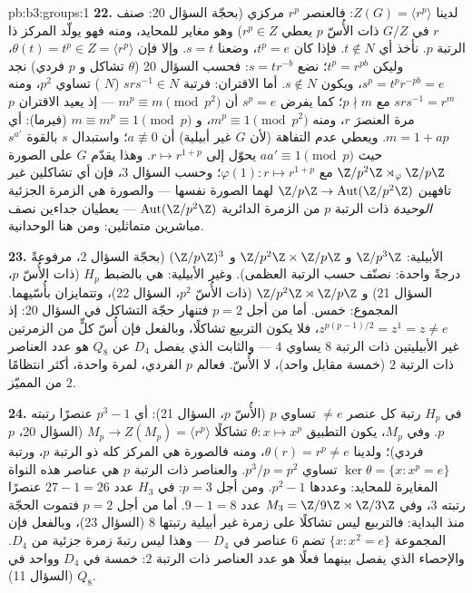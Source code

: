 \begin{solution}{pb:b3:groups:1}
\textbf{22.} لدينا $Z(G) = \langle r^p\rangle$: فالعنصر $r^p$ مركزي  (بحجّة
السؤال 20: صنف $r$ في  $G/Z$ ذات الأُسّ $p$ يعطي
$r^p \in Z$) وهو مغاير للمحايد، ومنه فهو يولّد المركز ذا الرتبة
$p$. نأخذ أي $t \notin N$. فإذا كان $t^p = e$، وضعنا $s = t$.
وإلا فإن $\theta(t) = t^p \in Z =
\langle r^p\rangle$، وليكن $t^p = r^{pb}$؛ نضع $s = tr^{-b}$: فحسب
السؤال 20 ($\theta$ تشاكل و $p$ فردي) نجد $s^p =
t^pr^{-pb} = e$، ويكون
$s \notin N$. أما الاقتران: فرتبة $srs^{-1} \in
N$ ($N$ ) تساوي
$p^2$، ومنه $srs^{-1} = r^m$ مع $p
\nmid m$؛ كما يفرض $s^p = e$ أن
$m^p \equiv m \pmod{p^2}$ --- إذ يعيد الاقتران $p$ مرة العنصرَ $r$، ومنه $m^p \equiv 1 \pmod
{p^2}$،
و $m \equiv m^p \equiv 1 \pmod p$ (فيرما): أي $m = 1 +
ap$. ويعطي عدم التفاهة (لأن $G$ غير
أبيلية) أن $a \not\equiv 0$؛ واستبدال $s$ بالقوة $s^{a'}$ حيث
$aa' \equiv 1 \pmod p$ يحوّل  إلى $r \mapsto r^{1+p}$. وهذا يقدّم $G$ على الصورة
$\Z/p^2\Z\rtimes_\varphi\Z/p\Z$ مع $\varphi(1)\colon r
\mapsto r^{1+p}$؛ وحسب السؤال 3، فإن أي تشاكلين غير تافهين
$\Z/p\Z \to \operatorname{Aut}(\Z/p^2\Z)$ لهما الصورة نفسها --- والصورة هي الزمرة الجزئية \emph{الوحيدة}
ذات الرتبة $p$ من الزمرة الدائرية $\operatorname{Aut}(\Z/p^2\Z)$ --- يعطيان جداءين نصف
مباشرين متماثلين: ومن هنا الوحدانية.

\textbf{23.} الأبيلية: $\Z/p^3\Z$ و $\Z/p^2\Z\times\Z/p\Z$ و $(\Z/p\Z)^3$
(بحجّة السؤال 2، مرفوعةً درجةً واحدة: نصنّف حسب الرتبة العظمى).
وغير الأبيلية: هي بالضبط $H_p$ (ذات الأُسّ $p$، السؤال 21) و
$\Z/p^2\Z\rtimes\Z/p\Z$ (ذات الأُسّ $p^2$، السؤال 22)، وتتمايزان بأُسّيهما.
المجموع: خمس. أما من أجل $p = 2$ فتنهار حجّة التشاكل في السؤال
20: إذ $z^{p(p-1)/2} = z^{1} = z \neq e$، فلا يكون التربيع تشاكلًا، وبالفعل فإن أُسّ كلٍّ
من الزمرتين غير الأبيليتين ذات الرتبة $8$ يساوي $4$ --- والثابت
الذي يفصل $D_4$ عن $Q_8$ هو عدد العناصر ذات الرتبة $2$ (خمسة
مقابل واحد)، لا الأُسّ. فعالم $p$ الفردي، لمرة واحدة، أكثر
انتظامًا من المميّز $2$.

\textbf{24.} في $H_p$ رتبة كل عنصر $\neq e$ تساوي $p$ (الأُسّ
$p$، السؤال 21): أي $p^3 - 1$ عنصرًا رتبته $p$. وفي $M_p$، يكون
التطبيق $\theta \colon x \mapsto x^p$ تشاكلًا $M_p \to Z(M_p) = \langle r^p\rangle$ (السؤال 20، $p$ فردي)؛ ولدينا
$\theta(r) = r^p \neq e$، ومنه فالصورة هي المركز كله ذو الرتبة $p$، ورتبة $\ker\theta = \{x : x^p = e\}$
تساوي $p^3/p =
p^2$. والعناصر ذات الرتبة $p$ هي عناصر هذه النواة
المغايرة للمحايد: وعددها $p^2 - 1$. ومن أجل $p = 3$: في $H_3$
عدد $27 - 1 = 26$ عنصرًا رتبته $3$، وفي $M_3 = \Z/9\Z \rtimes
\Z/3\Z$ عدد
$9 - 1 = 8$. أما من أجل $p = 2$ فتموت الحجّة منذ البداية:
فالتربيع ليس تشاكلًا على زمرة غير أبيلية رتبتها $8$ (السؤال 23)،
وبالفعل فإن المجموعة $\{x : x^2 = e\}$ تضم $6$ عناصر في $D_4$ --- وهذا
ليس رتبةَ زمرة جزئية من $D_4$. والإحصاء الذي يفصل بينهما فعلًا
هو عدد العناصر ذات الرتبة $2$: خمسة في $D_4$ وواحد في $Q_8$
(السؤال 11).


\end{solution}
